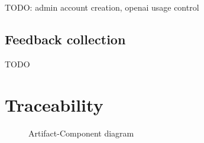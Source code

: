 \documentclass[
    english, %
]{VUMIFPSkursinis}
\begin{document}
TODO: admin account creation, openai usage control

\subsection{Feedback collection}

TODO

\section{Traceability}

\begin{figure}[ht]
    \centering
    
    \caption{Artifact-Component diagram}
    \label{artifact-diagram}
\end{figure}

\newlength{\tablewidth}
\setlength{\tablewidth}{0.5\textwidth}


\renewcommand{\thead}[1]{\bfseries\makecell{#1}}
\end{document}

